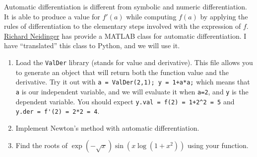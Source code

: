 \documentclass[letter]{article}
\begin{document}
Automatic differentiation is different from symbolic and numeric differentiation. It is able to produce a value for $f'(a)$ while computing $f(a)$ by applying the rules of differentiation to the elementary steps involved with the expression of $f$. \href{http://epubs.siam.org/doi/pdf/10.1137/080743627}{Richard Neidinger} has provide a MATLAB class for automatic differentiation. I have ``translated'' this class to Python, and we will use it. 

\begin{enumerate}[resume]

\item Load the \verb|ValDer| library (stands for value and derivative). This file allows you to generate an object that will return both the function value and the derivative. Try it out with \verb|a = ValDer(2,1); y = 1+a*a;| which means that \verb|a| is our independent variable, and we will evaluate it when \verb|a=2|, and \verb|y| is the dependent variable. You should expect \verb|y.val = f(2) = 1+2^2 = 5| and \verb|y.der = f'(2) = 2*2 = 4|.

\item Implement Newton's method with automatic differentiation.

\item Find the roots of $\exp(-\sqrt{x})\sin(x\log(1+x^2))$ using your function.

\end{enumerate}
\end{document}
